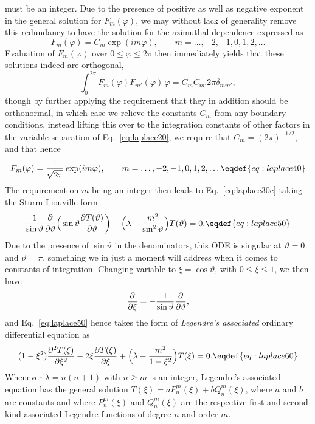 must be an integer. Due to the presence of positive as well as negative
exponent in the general solution for $F_m(\varphi)$, we may without lack of
generality remove this redundancy to have the solution for the azimuthal
dependence expressed as
$$
  F_m(\varphi)=C_m\exp(im\varphi),\qquad m=\ldots,-2,-1,0,1,2,\ldots
$$
Evaluation of $F_m(\varphi)$ over $0\le\varphi\le2\pi$ then immediately yields
that these solutions indeed are orthogonal,
$$
  \int^{2\pi}_0 F_m(\varphi)F_{m'}(\varphi)\,\varphi
    = C_m C_{m'}2\pi\delta_{mm'},
$$
though by further applying the requirement that they in addition should be
orthonormal, in which case we relieve the constants $C_m$ from any boundary
conditions, instead lifting this over to the integration constants of other
factors in the variable separation of Eq.~\eqref{eq:laplace20}, we require
that $C_m=(2\pi)^{-1/2}$, and that hence
$$
  F_m(\varphi)={{1}\over{\sqrt{2\pi}}}\exp(im\varphi),
  \qquad m=\ldots,-2,-1,0,1,2,\ldots
  \eqdef{eq:laplace40}
$$
The requirement on $m$ being an integer then leads to Eq.~\eqref{eq:laplace30c}
taking the Sturm-Liouville form
$$
  {{1}\over{\sin\vartheta}}
    {{\partial}\over{\partial\vartheta}}
    \Big(\sin\vartheta{{\partial T(\vartheta)}\over{\partial\vartheta}}\bigg)
    +\Big(\lambda - {{m^2}\over{\sin^2\vartheta}}\Big)T(\vartheta)=0.
  \eqdef{eq:laplace50}
$$
Due to the presence of $\sin\vartheta$ in the denominators, this ODE is
singular at $\vartheta=0$ and $\vartheta=\pi$, something we in just a moment
will address when it comes to constants of integration. Changing variable to
$\xi=\cos\vartheta$, with $0\le\xi\le1$, we then have
$$
  {{\partial}\over{\partial\xi}}
    =-{{1}\over{\sin\vartheta}}{{\partial}\over{\partial\vartheta}},
$$
and Eq.~\eqref{eq:laplace50} hence takes the form of {\it Legendre's associated}
ordinary differential equation as
$$
  (1-\xi^2){{\partial^2 T(\xi)}\over{\partial\xi^2}}
  -2\xi{{\partial T(\xi)}\over{\partial\xi}}
    +\Big(\lambda - {{m^2}\over{1-\xi^2}}\Big)T(\xi)=0.
  \eqdef{eq:laplace60}
$$
Whenever $\lambda=n(n+1)$ with $n\ge m$ is an integer, Legendre's associated
equation has the general solution $T(\xi)=aP^m_n(\xi)+bQ^m_n(\xi)$, where $a$
and $b$ are constants and where $P^m_n(\xi)$ and $Q^m_n(\xi)$ are the respective
first and second kind associated Legendre functions of degree $n$ and order $m$.

